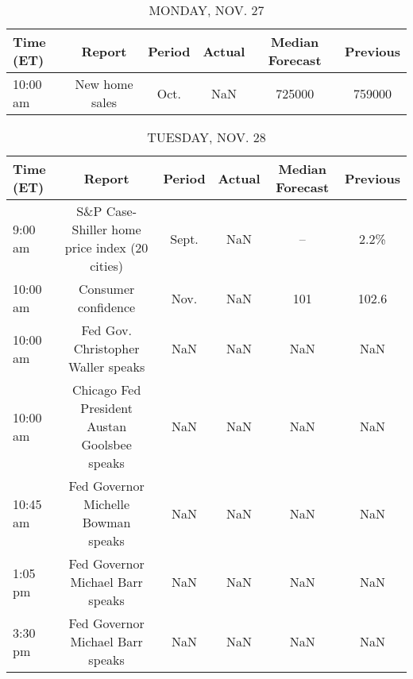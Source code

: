 \documentclass{article}%
\begin{document}
%
\normalsize%


\begin{table}[htbp]%
\caption{MONDAY, NOV. 27}%
\centering%
\begin{adjustbox}{width=1\textwidth}%
\begin{tabular}{lccccc}
\toprule
Time (ET) &         Report & Period & Actual & Median Forecast & Previous \\
\midrule
 10:00 am & New home sales &   Oct. &    NaN &          725000 &   759000 \\
\bottomrule
\end{tabular}
%
\end{adjustbox}%
\end{table}

%


\begin{table}[htbp]%
\caption{TUESDAY, NOV. 28}%
\centering%
\begin{adjustbox}{width=1\textwidth}%
\begin{tabular}{lccccc}
\toprule
Time (ET) &                                        Report & Period & Actual & Median Forecast & Previous \\
\midrule
  9:00 am & S\&P Case-Shiller home price index (20 cities) &  Sept. &    NaN &              -- &     2.2\% \\
 10:00 am &                           Consumer confidence &   Nov. &    NaN &             101 &    102.6 \\
 10:00 am &            Fed Gov. Christopher Waller speaks &    NaN &    NaN &             NaN &      NaN \\
 10:00 am &  Chicago Fed President Austan Goolsbee speaks &    NaN &    NaN &             NaN &      NaN \\
 10:45 am &           Fed Governor Michelle Bowman speaks &    NaN &    NaN &             NaN &      NaN \\
  1:05 pm &              Fed Governor Michael Barr speaks &    NaN &    NaN &             NaN &      NaN \\
  3:30 pm &              Fed Governor Michael Barr speaks &    NaN &    NaN &             NaN &      NaN \\
\bottomrule
\end{tabular}
%
\end{adjustbox}%
\end{table}

%
\end{document}
